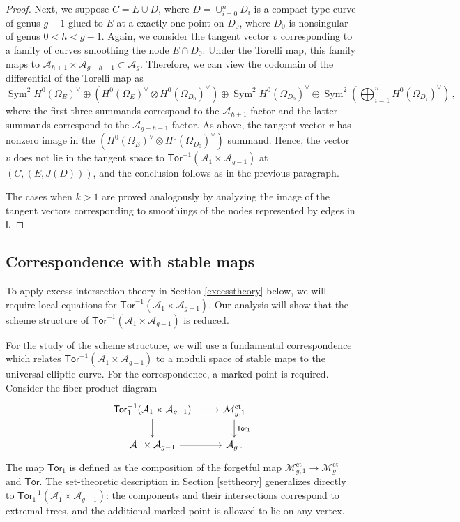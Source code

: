 \documentclass[11pt]{amsart}
\theoremstyle{definition}
\newcommand{\M}{\mathcal{M}}
\newcommand{\A}{\mathcal{A}}
\DeclareMathOperator{\ct}{ct}
\newcommand{\Tor}{\mathsf{Tor}}
\DeclareMathOperator{\Sym}{Sym}
\begin{document}
{\begin{proof}
    Next, we suppose $C=E\cup D$, where $D=\cup_{i=0}^{n} D_i$ is a compact type curve of genus $g-1$ glued to $E$ at a exactly one point on $D_0$, where $D_0$ is nonsingular of genus $0<h<g-1$. Again, we consider the tangent vector $v$ corresponding to a family of curves smoothing the node $E\cap D_0$. Under the Torelli map, this family maps to $\A_{h+1}\times \A_{g-h-1}\subset \A_g$. %
    Therefore, we can view the codomain of the differential of the Torelli map as 
    \[
    \Sym^2 H^0(\Omega_E)^{\vee}\oplus (H^0(\Omega_E)^{\vee}\otimes H^0(\Omega_{D_0})^{\vee}) \oplus \Sym^2 H^0(\Omega_{D_0})^{\vee}\oplus \Sym^2 \left(\bigoplus_{i=1}^{n} H^0(\Omega_{D_i})^{\vee}\right)\,,
    \]
    where the first three summands correspond to the $\A_{h+1}$ factor and the latter summands correspond to the $\A_{g-h-1}$ factor.
    As above, the tangent vector $v$ has nonzero image in the $(H^0(\Omega_E)^{\vee}\otimes H^0(\Omega_{D_0})^{\vee})$ summand. %
    Hence, the vector $v$ does not lie in the tangent space to $\Tor^{-1}(\A_1\times \A_{g-1})$ at $(C, (E,J(D)))$, and the conclusion follows as in the previous paragraph. 

    The cases when $k>1$ are proved analogously by analyzing the image of the tangent vectors corresponding to smoothings of the nodes represented by edges in $\mathsf{I}$.
     \end{proof}

\subsection{Correspondence with stable maps}
To apply excess intersection theory in Section \ref{excesstheory} below, we will require local
equations for  $\Tor^{-1}(\A_1\times \A_{g-1})$. Our analysis will show  
 that the scheme structure of $\Tor^{-1}(\A_1\times \A_{g-1})$
is reduced. 

For the study of the scheme structure,
we will use a fundamental correspondence which relates $\Tor^{-1}(\A_1\times \A_{g-1})$ to a moduli space of stable maps to the universal elliptic curve. 
For the
correspondence, a marked point is required.
Consider the fiber product diagram
\begin{equation}\label{Tor1}
\begin{tikzcd}
\Tor_1^{-1}(\A_1\times \A_{g-1}) \arrow[d] \arrow[r] & \M_{g,1}^{\ct} \arrow[d, "\Tor_1"] \\
\A_1\times \A_{g-1} \arrow[r]       & \A_g \, .                       
\end{tikzcd}
    \end{equation}
The map $\Tor_1$ is defined as the composition of the forgetful map $\M_{g,1}^{\ct}\rightarrow \M_g^{\ct}$ and $\Tor$. The set-theoretic description in Section \ref{settheory} generalizes directly to $\Tor_1^{-1}(\A_1\times \A_{g-1})$: the components and their intersections correspond to extremal trees, and the additional marked point is allowed to lie on any vertex. 

}
\end{document}
